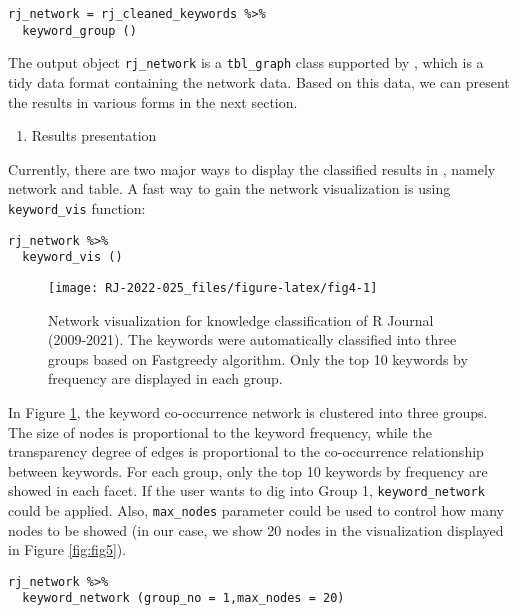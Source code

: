 \begin{verbatim}
rj_network = rj_cleaned_keywords %>% 
  keyword_group ()
\end{verbatim}

The output object \texttt{rj\_network} is a \texttt{tbl\_graph} class supported by , which is a tidy data format containing the network data. Based on this data, we can present the results in various forms in the next section.

\begin{enumerate}
\def\labelenumi{(\arabic{enumi})}
\setcounter{enumi}{3}
\tightlist
\item
  Results presentation
\end{enumerate}

Currently, there are two major ways to display the classified results in , namely network and table. A fast way to gain the network visualization is using \texttt{keyword\_vis} function:

\begin{verbatim}
rj_network %>% 
  keyword_vis ()
\end{verbatim}

\begin{figure}

{\centering \texttt{[image: RJ-2022-025\_files/figure-latex/fig4-1]} 

}

\caption{Network visualization for knowledge classification of R Journal (2009-2021). The keywords were automatically classified into three groups based on Fastgreedy algorithm. Only the top 10 keywords by frequency are displayed in each group.}\label{fig:fig4}
\end{figure}

In Figure \ref{fig:fig4}, the keyword co-occurrence network is clustered into three groups. The size of nodes is proportional to the keyword frequency, while the transparency degree of edges is proportional to the co-occurrence relationship between keywords. For each group, only the top 10 keywords by frequency are showed in each facet. If the user wants to dig into Group 1, \texttt{keyword\_network} could be applied. Also, \texttt{max\_nodes} parameter could be used to control how many nodes to be showed (in our case, we show 20 nodes in the visualization displayed in Figure \ref{fig:fig5}).

\begin{verbatim}
rj_network %>% 
  keyword_network (group_no = 1,max_nodes = 20) 
\end{verbatim}

